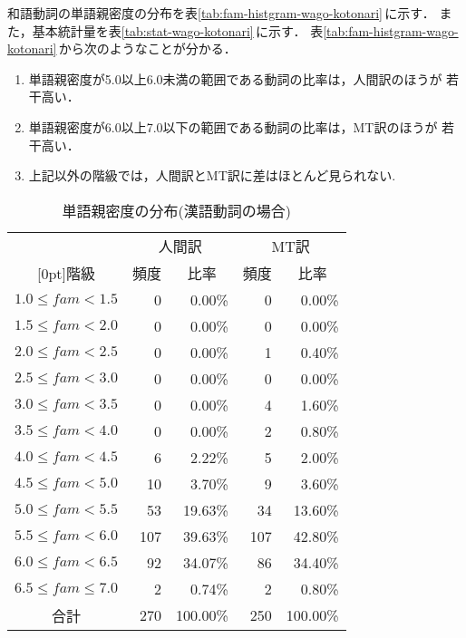 和語動詞の単語親密度の分布を表\ref{tab:fam-histgram-wago-kotonari}\,に示す．
また，基本統計量を表\ref{tab:stat-wago-kotonari}\,に示す．
表\ref{tab:fam-histgram-wago-kotonari}\,から次のようなことが分かる．
\begin{enumerate}
\item 単語親密度が5.0以上6.0未満の範囲である動詞の比率は，人間訳のほうが
若干高い．
\item 単語親密度が6.0以上7.0以下の範囲である動詞の比率は，MT訳のほうが
若干高い．
\item
上記以外の階級では，人間訳とMT訳に差はほとんど見られない.
\end{enumerate}
\begin{table}[htbp]
\caption{単語親密度の分布(漢語動詞の場合)} 
\label{tab:fam-histgram-kango-kotonari}
\begin{center}
\begin{tabular}{|c||r|r|r|r|}\hline
& \multicolumn{2}{c|}{人間訳} & \multicolumn{2}{c|}{MT訳} \\\cline{2-5}
\raisebox{1.5ex}[0pt]{階級} & \multicolumn{1}{c|}{頻度} & \multicolumn{1}{c|}{比率} & 
\multicolumn{1}{c|}{頻度} & \multicolumn{1}{c|}{比率} \\\hline \hline
$1.0 \le fam < 1.5$   &   0 &   0.00\% &   0 &   0.00\% \\
$1.5 \le fam < 2.0$   &   0 &   0.00\% &   0 &   0.00\% \\
$2.0 \le fam < 2.5$   &   0 &   0.00\% &   1 &   0.40\% \\
$2.5 \le fam < 3.0$   &   0 &   0.00\% &   0 &   0.00\% \\
$3.0 \le fam < 3.5$   &   0 &   0.00\% &   4 &   1.60\% \\
$3.5 \le fam < 4.0$   &   0 &   0.00\% &   2 &   0.80\% \\
$4.0 \le fam < 4.5$   &   6 &   2.22\% &   5 &   2.00\% \\
$4.5 \le fam < 5.0$   &  10 &   3.70\% &   9 &   3.60\% \\
$5.0 \le fam < 5.5$   &  53 &  19.63\% &  34 &  13.60\% \\
$5.5 \le fam < 6.0$   & 107 &  39.63\% & 107 &  42.80\% \\
$6.0 \le fam < 6.5$   &  92 &  34.07\% &  86 &  34.40\% \\
$6.5 \le fam \le 7.0$ &   2 &   0.74\% &   2 &   0.80\% \\\hline
合計                  & 270 & 100.00\% & 250 & 100.00\% \\\hline
\end{tabular}
\end{center}
\end{table}
